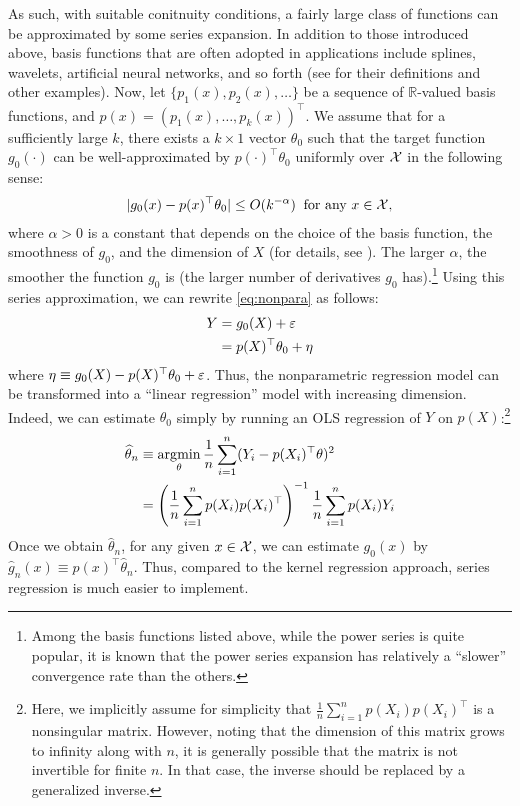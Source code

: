 \documentclass[11pt, A4paper, openany, uplatex]{book}
\begin{document}
As such, with suitable conitnuity conditions, a fairly large class of functions can be approximated by some series expansion.
In addition to those introduced above, basis functions that are often adopted in applications include splines, wavelets, artificial neural networks, and so forth (see \cite{chen2007large} for their definitions and other examples).
Now, let $\{p_1(x), p_2(x), \ldots \}$ be a sequence of $\mathbb{R}$-valued basis functions, and $p(x) = (p_1(x), \ldots , p_k(x))^\top$.
We assume that for a sufficiently large $k$, there exists a $k \times 1$ vector $\theta_0$ such that the target function $g_0(\cdot)$ can be well-approximated by $p(\cdot)^\top\theta_0$ uniformly over $\mathcal{X}$ in the following sense:
\begin{align*}
	|g_0(x) - p(x)^\top\theta_0 | \le O(k^{-\alpha}) \;\; \text{for any $x \in \mathcal{X}$},
\end{align*}
where $\alpha > 0$ is a constant that depends on the choice of the basis function, the smoothness of $g_0$, and the dimension of $X$ (for details, see \cite{chen2007large}).
The larger $\alpha$, the smoother the function $g_0$ is (the larger number of derivatives $g_0$ has).\footnote{
	Among the basis functions listed above, while the power series is quite popular, it is known that the power series expansion has relatively a ``slower'' convergence rate than the others.
}
Using this series approximation, we can rewrite \eqref{eq:nonpara} as follows:
\begin{align*}
	Y
	& = g_0(X) + \varepsilon\\
	& = p(X)^\top\theta_0 + \eta
\end{align*}
where $\eta \equiv g_0(X) - p(X)^\top\theta_0 + \varepsilon$.
Thus, the nonparametric regression model can be transformed into a ``linear regression'' model with increasing dimension.
Indeed, we can estimate $\theta_0$ simply by running an OLS regression of $Y$ on $p(X)$:\footnote{
	Here, we implicitly assume for simplicity that $\frac{1}{n}\sum_{i = 1}^n p(X_i)p(X_i)^\top$ is a nonsingular matrix.
	However, noting that the dimension of this matrix grows to infinity along with $n$, it is generally possible that the matrix is not invertible for finite $n$.
	In that case, the inverse should be replaced by a generalized inverse.
	}
\begin{align*}
	\widehat \theta_n 
	& \equiv \operatorname*{\arg\!\min}_\theta \frac{1}{n}\sum_{i = 1}^n (Y_i -  p(X_i)^\top\theta)^2 \\
	& = \left(\frac{1}{n}\sum_{i = 1}^n p(X_i)p(X_i)^\top\right)^{-1}\frac{1}{n}\sum_{i = 1}^n p(X_i)Y_i
\end{align*}
Once we obtain $\hat \theta_n$, for any given $x \in \mathcal{X}$, we can estimate $g_0(x)$ by $\hat g_n(x)  \equiv p(x)^\top \hat \theta_n$.
Thus, compared to the kernel regression approach, series regression is much easier to implement.
\end{document}
